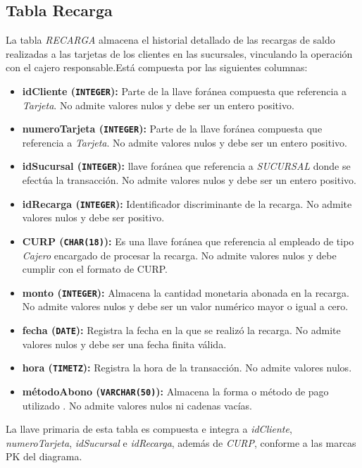 \subsection{Tabla Recarga}La tabla \textit{RECARGA} almacena el historial detallado de las recargas de saldo realizadas a las tarjetas de los clientes en las sucursales, vinculando la operación con el cajero responsable.Está compuesta por las siguientes columnas:
\begin{itemize}
    \item \textbf{idCliente (\texttt{INTEGER}):} Parte de la llave foránea compuesta que referencia a \textit{Tarjeta}. No admite valores nulos y debe ser un entero positivo.
    \item \textbf{numeroTarjeta (\texttt{INTEGER}):} Parte de la llave foránea compuesta que referencia a \textit{Tarjeta}. No admite valores nulos y debe ser un entero positivo.
    \item \textbf{idSucursal (\texttt{INTEGER}):} llave foránea que referencia a \textit{SUCURSAL} donde se efectúa la transacción. No admite valores nulos y debe ser un entero positivo.
    \item \textbf{idRecarga (\texttt{INTEGER}):} Identificador discriminante de la recarga. No admite valores nulos y debe ser positivo.
    \item \textbf{CURP (\texttt{CHAR(18)}):} Es una llave foránea que referencia al empleado de tipo \textit{Cajero} encargado de procesar la recarga. No admite valores nulos y debe cumplir con el formato de CURP.
    \item \textbf{monto (\texttt{INTEGER}):} Almacena la cantidad monetaria abonada en la recarga. No admite valores nulos y debe ser un valor numérico mayor o igual a cero.
    \item \textbf{fecha (\texttt{DATE}):} Registra la fecha en la que se realizó la recarga. No admite valores nulos y debe ser una fecha finita válida.
    \item \textbf{hora (\texttt{TIMETZ}):} Registra la hora de la transacción. No admite valores nulos.
    \item \textbf{métodoAbono (\texttt{VARCHAR(50)}):} Almacena la forma o método de pago utilizado . No admite valores nulos ni cadenas vacías.
\end{itemize}
La llave primaria de esta tabla es compuesta e integra a \textit{idCliente}, \textit{numeroTarjeta}, \textit{idSucursal} e \textit{idRecarga}, además de \textit{CURP}, conforme a las marcas PK del diagrama.
